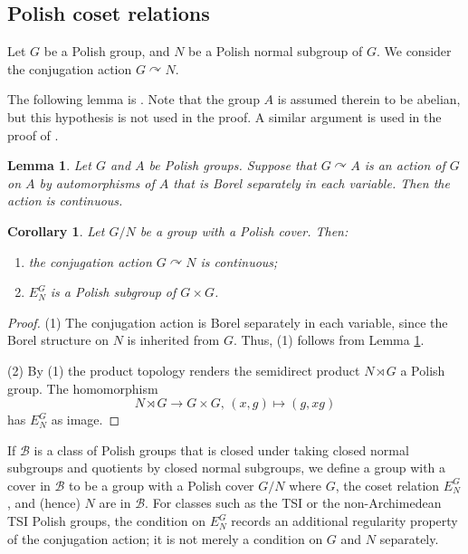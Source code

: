 \documentclass[12pt]{amsart}
\newtheorem{lemma}[theorem]{Lemma}
\newtheorem{corollary}[theorem]{Corollary}
\theoremstyle{definition}
\begin{document}
\subsection{Polish coset relations}

Let $G$ be a Polish group, and $N$ be a Polish normal subgroup of $G$. We
consider the conjugation action $G\curvearrowright N$.

The following lemma is \cite[Lemma 4.20]{lupini_looking_2024}. Note that the
group $A$ is assumed therein to be abelian, but this hypothesis is not used
in the proof. A similar argument is used in the proof of \cite[Proposition
3.5]{reid_chief_2022}.

\begin{lemma}
\label{Lemma:G-module} Let $G$ and $A$ be Polish groups. Suppose that $%
G\curvearrowright A$ is an action of $G$ on $A$ by automorphisms of $A$ that
is Borel separately in each variable. Then the action is continuous.
\end{lemma}

\begin{corollary}
\label{Corollary:continuous-conjugation} Let $G/N$ be a group with a Polish
cover. Then:

\begin{enumerate}
\item the conjugation action $G\curvearrowright N$ is continuous;

\item $E_{N}^{G}$ is a Polish subgroup of $G\times G$.
\end{enumerate}
\end{corollary}

\begin{proof}
(1) The conjugation action is Borel separately in each variable, since the
Borel structure on $N$ is inherited from $G$. Thus, (1) follows from Lemma %
\ref{Lemma:G-module}.

(2) By (1) the product topology renders the semidirect product $N\rtimes G$
a Polish group. The homomorphism 
\begin{equation*}
N\rtimes G\rightarrow G\times G\text{, }\left( x,g\right) \mapsto \left(
g,xg\right)
\end{equation*}%
has $E_{N}^{G}$ as image.
\end{proof}

If $\mathcal{B}$ is a class of Polish groups that is closed under taking
closed normal subgroups and quotients by closed normal subgroups, we define
a group with a cover in $\mathcal{B}$ to be a group with a Polish cover $G/N$
where $G$, the coset relation $E_{N}^{G}$, and (hence) $N$ are in $\mathcal{B%
}$. For classes such as the TSI or the non-Archimedean TSI Polish groups,
the condition on $E_{N}^{G}$ records an additional regularity property of
the conjugation action; it is not merely a condition on $G$ and $N$
separately.
\end{document}
